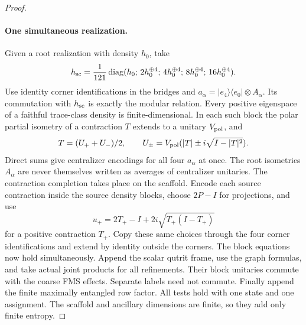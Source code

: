 \begin{proof}
\paragraph{One simultaneous realization.}
Given a root realization with density $h_0$, take
\begin{equation}\label{eq:scaffold}
 h_{\rm sc}=\frac1{121}\operatorname{diag}
 (h_0;\,2h_0^{\oplus4};\,4h_0^{\oplus4};\,8h_0^{\oplus4};\,16h_0^{\oplus4}).
\end{equation}
Use identity corner identifications in the bridges and $a_\alpha=|e_4\rangle\langle e_0|\otimes A_\alpha$. Its commutation with $h_{\rm sc}$ is exactly the modular relation. Every positive eigenspace of a faithful trace-class density is finite-dimensional. In each such block the polar partial isometry of a contraction $T$ extends to a unitary $V_{\rm pol}$, and
\[
 T=(U_++U_-)/2,\qquad
 U_\pm=V_{\rm pol}(|T|\pm i\sqrt{I-|T|^2}).
\]
Direct sums give centralizer encodings for all four $a_\alpha$ at once. The root isometries $A_\alpha$ are never themselves written as averages of centralizer unitaries. The contraction completion takes place on the scaffold. Encode each source contraction inside the source density blocks, choose $2P-I$ for projections, and use
\[
 u_+=2T_+-I+2i\sqrt{T_+(I-T_+)}
\]
for a positive contraction $T_+$. Copy these same choices through the four corner identifications and extend by identity outside the corners. The block equations now hold simultaneously. Append the scalar qutrit frame, use the graph formulas, and take actual joint products for all refinements. Their block unitaries commute with the coarse FMS effects. Separate labels need not commute. Finally append the finite maximally entangled row factor. All tests hold with one state and one assignment. The scaffold and ancillary dimensions are finite, so they add only finite entropy.


\end{proof}
